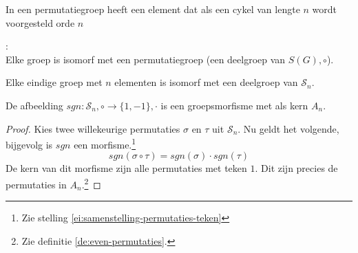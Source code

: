 \documentclass[main.tex]{subfiles}
\begin{document}
\begin{st}
  In een permutatiegroep heeft een element dat als een cykel van lengte $n$ wordt voorgesteld orde $n$

\end{st}

\begin{st}
  \label{st:stelling-van-cayley}
  :\\
  Elke groep is isomorf met een permutatiegroep (een deelgroep van $S(G),\circ$).

\end{st}

\begin{gev}
  Elke eindige groep met $n$ elementen is isomorf met een deelgroep van $\mathcal{S}_{n}$.

\end{gev}

\begin{pr}
  De afbeelding $sgn: \mathcal{S}_{n},\circ \rightarrow \{1,-1\},\cdot$ is een groepsmorfisme met als kern $A_{n}$.

  \begin{proof}
    Kies twee willekeurige permutaties $\sigma$ en $\tau$ uit $\mathcal{S}_{n}$.
    Nu geldt het volgende, bijgevolg is $sgn$ een morfisme.\footnote{Zie stelling \ref{ei:samenstelling-permutaties-teken}}
    \[ sgn(\sigma \circ \tau) = sgn(\sigma) \cdot sgn(\tau) \]
    De kern van dit morfisme zijn alle permutaties met teken $1$.
    Dit zijn precies de permutaties in $A_{n}$.\footnote{Zie definitie \ref{de:even-permutaties}.}
  \end{proof}
\end{pr}
 
\end{document}
